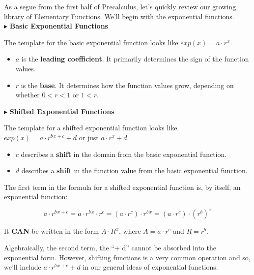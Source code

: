 \documentclass{ximera}
\begin{document}
As a segue from the first half of Precalculus, let's quickly review our growing library of Elementary Functions. We'll begin with the exponential functions.   \\





$\blacktriangleright$ \textbf{\textcolor{blue!55!black}{Basic Exponential Functions}} 


The template for the basic exponential function looks like \textbf{\textcolor{blue!55!black}{$exp(x) = a \cdot r^x$}}. 

\begin{itemize}
\item $a$ is the \textbf{\textcolor{purple!85!blue}{leading coefficient}}.  It primarily determines the sign of the function values.
\item $r$ is the \textbf{\textcolor{purple!85!blue}{base}}. It determines how the function values grow, depending on whether $0 < r < 1$ or $1 < r$.
\end{itemize}





$\blacktriangleright$ \textbf{\textcolor{blue!55!black}{Shifted Exponential Functions}}   

The template for a shifted exponential function looks like \textbf{\textcolor{blue!55!black}{$exp(x) = a \cdot r^{b \, x + c} + d$}}  or just \textbf{\textcolor{blue!55!black}{$a \cdot r^x + d$}}. 

\begin{itemize}
\item $c$ describes a \textbf{\textcolor{purple!85!blue}{shift}} in the domain from the basic exponential function.  
\item $d$ describes a \textbf{\textcolor{purple!85!blue}{shift}} in the function value from the basic exponential function. 
\end{itemize}

The first term in the formula for a shifted exponential function is, by itself, an exponential function:

\[
a \cdot r^{b \, x + c} = a \cdot r^{b \, x} \cdot  r^c = (a \cdot r^c) \cdot r^{b \, x} = (a \cdot r^c) \cdot (r^b)^x 
\]

It \textbf{\textcolor{purple!85!blue}{CAN}} be written in the form $A \cdot R^x$, where $A = a \cdot r^c$ and $R = r^b$.


Algebraically, the second term, the ``+ d'' cannot be absorbed into the exponential form.  However, shifting functions is a very common operation and so, we'll include $a \cdot r^{b \, x + c} + d$ in our general ideas of exponential functions.
\end{document}
